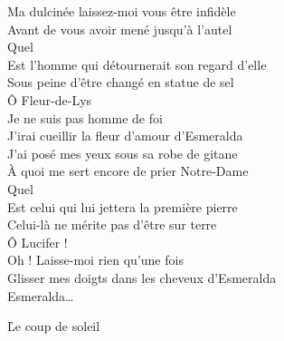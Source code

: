 \documentclass{novel}
\begin{document}
\begin{multicols}{2}
Ma dulcinée laissez-moi vous être infidèle \\
Avant de vous avoir mené jusqu'à l'autel \\
Quel \\
Est l'homme qui détournerait son regard d'elle \\
Sous peine d'être changé en statue de sel \\

Ô Fleur-de-Lys \\
Je ne suis pas homme de foi \\
J'irai cueillir la fleur d'amour d'Esmeralda \\

J'ai posé mes yeux sous sa robe de gitane \\
À quoi me sert encore de prier Notre-Dame \\
Quel \\
Est celui qui lui jettera la première pierre \\
Celui-là ne mérite pas d'être sur terre \\

Ô Lucifer ! \\
Oh ! Laisse-moi rien qu'une fois \\
Glisser mes doigts dans les cheveux d'Esmeralda \\

Esmeralda…

\end{multicols}

\newpage
\normalsize
\h*{Le coup de soleil}
\end{document}
